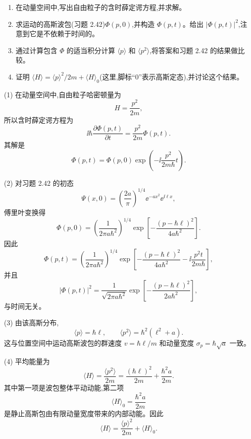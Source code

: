 \begin{question}
\begin{enumerate}
\item 在动量空间中,写出自由粒子的含时薛定谔方程,并求解。
\item 求运动的高斯波包(习题 2.42)$\Phi(p,0)$,并构造 $\Phi(p,t)$。给出 $|\Phi(p,t)|^2$,注意到它是不依赖于时间的。
\item 通过计算包含 $\Phi$ 的适当积分计算 $\langle p\rangle$ 和 $\langle p^2\rangle$,将答案和习题 2.42 的结果做比较。
\item 证明 $\langle H\rangle=\langle p\rangle^2/2m+\langle H\rangle_0$(这里,脚标“0”表示高斯定态),并讨论这个结果。
\end{enumerate}
\end{question}
\begin{solution}
(1) 在动量空间中,自由粒子哈密顿量为
\[
H=\frac{p^2}{2m},
\]
所以含时薛定谔方程为
\[
\ii\hbar\frac{\partial\Phi(p,t)}{\partial t}=\frac{p^2}{2m}\Phi(p,t).
\]
其解是
\[
\boxed{\Phi(p,t)=\Phi(p,0)\exp\left(-\ii\frac{p^2}{2m\hbar}t\right).}
\]

(2) 对习题 2.42 的初态
\[
\Psi(x,0)=\left(\frac{2a}{\pi}\right)^{1/4}\ee^{-ax^2}\ee^{\ii\ell x},
\]
傅里叶变换得
\[
\boxed{\Phi(p,0)=\left(\frac1{2\pi a\hbar^2}\right)^{1/4}
\exp\left[-\frac{(p-\hbar\ell)^2}{4a\hbar^2}\right].}
\]
因此
\[
\Phi(p,t)=\left(\frac1{2\pi a\hbar^2}\right)^{1/4}
\exp\left[-\frac{(p-\hbar\ell)^2}{4a\hbar^2}
-\ii\frac{p^2t}{2m\hbar}\right],
\]
并且
\[
|\Phi(p,t)|^2=\frac1{\sqrt{2\pi a\hbar^2}}
\exp\left[-\frac{(p-\hbar\ell)^2}{2a\hbar^2}\right],
\]
与时间无关。

(3) 由该高斯分布,
\[
\boxed{\langle p\rangle=\hbar\ell,}
\qquad
\boxed{\langle p^2\rangle=\hbar^2(\ell^2+a).}
\]
这与位置空间中运动高斯波包的群速度 $v=\hbar\ell/m$ 和动量宽度 $\sigma_p=\hbar\sqrt a$ 一致。

(4) 平均能量为
\[
\langle H\rangle=\frac{\langle p^2\rangle}{2m}
=\frac{(\hbar\ell)^2}{2m}+\frac{\hbar^2a}{2m}.
\]
其中第一项是波包整体平动动能,第二项
\[
\boxed{\langle H\rangle_0=\frac{\hbar^2a}{2m}}
\]
是静止高斯包由有限动量宽度带来的内部动能。因此
\[
\boxed{\langle H\rangle=\frac{\langle p\rangle^2}{2m}+\langle H\rangle_0.}
\]
\end{solution}
